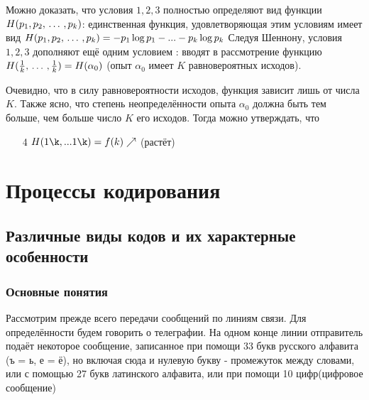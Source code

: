 \documentclass[a4paper,12pt]{report}
\begin{document}

	
	Можно доказать, что условия $1,2,3$ полностью определяют вид функции $H(p_1,p_2, \,\ldots\, ,p_k)$: единственная функция, удовлетворяющая этим условиям имеет вид $H(p_1,p_2, \,\ldots\, ,p_k) = -p_1\log p_1 - ... - p_k \log p_k$
	Следуя Шеннону, условия $1,2,3$ дополняют ещё одним условием : вводят в рассмотрение функцию $H(\frac{1}{k}, \,\ldots\, ,\frac{1}{k}) = H(\alpha_0)$ (опыт $\alpha_0$ имеет $K$ равновероятных исходов). 
	
	Очевидно, что в силу равновероятности исходов, функция зависит лишь от числа $K$. Также ясно, что степень неопределённости опыта $\alpha_0$ должна быть тем больше, чем больше число $K$ его исходов. Тогда можно утверждать, что
	
	
	\begin{enumerate}

	\item[4] $H(1\k,...1\k) = f(k)\nearrow$ (растёт)
	
	\end{enumerate}		
	


	
	\pagebreak
	
	\section{Процессы кодирования}
	
	
	
	
	\subsection{Различные виды кодов и их характерные особенности}
	
	
	
	
	\subsubsection{Основные понятия}
	
	Рассмотрим прежде всего  передачи сообщений по линиям связи. Для определённости будем говорить о телеграфии. На одном конце линии отправитель подаёт некоторое сообщение, записанное при помощи 33 букв русского алфавита (ъ = ь, е = ё), но включая сюда и нулевую букву - промежуток между словами, или с помощью 27 букв латинского алфавита, или при помощи 10 цифр(цифровое сообщение)
	
\end{document}
